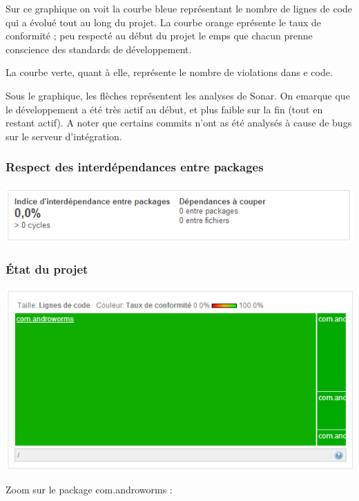 \documentclass{report}
\begin{document}
Sur ce graphique on voit la courbe bleue représentant le nombre de
lignes de code qui a évolué tout au long du projet. La courbe orange
eprésente le taux de conformité ; peu respecté au début du projet le
emps que chacun prenne conscience des standards de développement. 

La courbe verte, quant à elle, représente le nombre de violations dans
e code.

Sous le graphique, les flèches représentent les analyses de Sonar. On
emarque que le développement a été très actif au début, et plus faible
sur la fin (tout en restant actif). A noter que certains commits n’ont
as été analysés à cause de bugs sur le serveur d’intégration.

\subsubsection{Respect des interdépendances entre packages}
\begin{center}
\includegraphics[scale=0.5]{images/depedencies}
\end{center}

\subsubsection{État du projet}
\begin{center}
\includegraphics[scale=0.8]{images/state1}
\end{center}
Zoom sur le package com.androworms :
\end{document}

